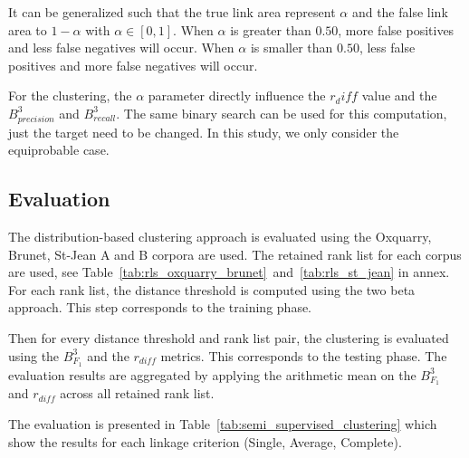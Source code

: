 It can be generalized such that the true link area represent $\alpha$ and the false link area to $1-\alpha$ with $\alpha \in \left[0,1\right]$.
When $\alpha$ is greater than $0.50$, more false positives and less false negatives will occur.
When $\alpha$ is smaller than $0.50$, less false positives and more false negatives will occur.

For the clustering, the $\alpha$ parameter directly influence the $r_diff$ value and the $B^3_{precision}$ and $B^3_{recall}$.
The same binary search can be used for this computation, just the target need to be changed.
In this study, we only consider the equiprobable case.

\subsection{Evaluation}

The distribution-based clustering approach is evaluated using the Oxquarry, Brunet, St-Jean A and B corpora are used.
The retained rank list for each corpus are used, see Table~\ref{tab:rls_oxquarry_brunet}~and~\ref{tab:rls_st_jean} in annex.
For each rank list, the distance threshold is computed using the two beta approach.
This step corresponds to the training phase.

Then for every distance threshold and rank list pair, the clustering is evaluated using the $B^3_{F_1}$ and the $r_{diff}$ metrics.
This corresponds to the testing phase.
The evaluation results are aggregated by applying the arithmetic mean on the $B^3_{F_1}$ and $r_{diff}$ across all retained rank list.

The evaluation is presented in Table~\ref{tab:semi_supervised_clustering} which show the results for each linkage criterion (Single, Average, Complete).

